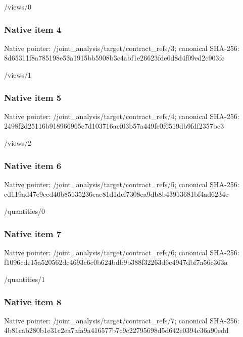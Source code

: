 \documentclass[10pt,a4paper]{article}
\begin{document}
\begingroup\raggedright\sloppy /\allowbreak{}views/\allowbreak{}0\par\endgroup

\subsubsection{Native item 4}
Native pointer: /joint\_\allowbreak{}analysis/target/contract\_\allowbreak{}refs/3; canonical SHA-256: 8d65311f8a785198e53a1915bb5908b3c4abf1e26623fde6d8d4f09ed2c903fc

\begingroup\raggedright\sloppy /\allowbreak{}views/\allowbreak{}1\par\endgroup

\subsubsection{Native item 5}
Native pointer: /joint\_\allowbreak{}analysis/target/contract\_\allowbreak{}refs/4; canonical SHA-256: 2498f2d25116b918966965c7d103716acf03b57a449fc0f6519db9fdf2357be3

\begingroup\raggedright\sloppy /\allowbreak{}views/\allowbreak{}2\par\endgroup

\subsubsection{Native item 6}
Native pointer: /joint\_\allowbreak{}analysis/target/contract\_\allowbreak{}refs/5; canonical SHA-256: cd119ad47e9ced40b85135236eae81d1dcf7308ea9db8b43913681bf4ad6234c

\begingroup\raggedright\sloppy /\allowbreak{}quantities/\allowbreak{}0\par\endgroup

\subsubsection{Native item 7}
Native pointer: /joint\_\allowbreak{}analysis/target/contract\_\allowbreak{}refs/6; canonical SHA-256: f1096cde15a520562dc4693c6e0b624bdb9b388f32263d6c4947dbf7a56c363a

\begingroup\raggedright\sloppy /\allowbreak{}quantities/\allowbreak{}1\par\endgroup

\subsubsection{Native item 8}
Native pointer: /joint\_\allowbreak{}analysis/target/contract\_\allowbreak{}refs/7; canonical SHA-256: 4b81cab280b1e31c2ea7afa9a416577b7c9c22795698d5d642e0394c36a90edd
\end{document}
